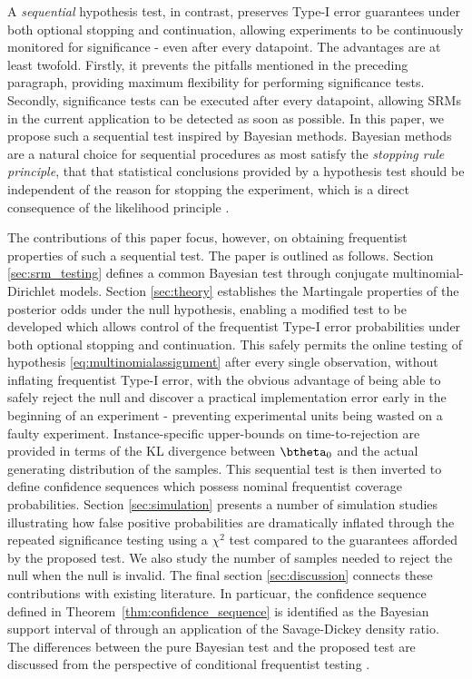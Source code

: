\documentclass[11pt]{article}
\begin{document}
A \textit{sequential} hypothesis test, in contrast, preserves Type-I error guarantees under both optional stopping and continuation, allowing experiments to be continuously monitored for significance - even after every datapoint.
The advantages are at least twofold. Firstly, it prevents the pitfalls mentioned in the preceding paragraph, providing maximum flexibility for performing significance tests.
Secondly, significance tests can be executed after every datapoint, allowing SRMs in the current application to be detected as soon as possible.
In this paper, we propose such a sequential test inspired by Bayesian methods.
Bayesian methods are a natural choice for sequential procedures as most satisfy the \textit{stopping rule principle}, that that statistical conclusions provided by a hypothesis test should be independent of the reason for stopping the experiment, which is a direct consequence of the likelihood principle \citep{likelihood}.

The contributions of this paper focus, however, on obtaining frequentist properties of such a sequential test.
The paper is outlined as follows.
Section \ref{sec:srm_testing} defines a common Bayesian test through conjugate multinomial-Dirichlet models.
Section \ref{sec:theory} establishes the Martingale properties of the posterior odds under the null hypothesis, enabling a modified test to be developed which allows control of the frequentist Type-I error probabilities under both optional stopping and continuation.
This safely permits the online testing of hypothesis \eqref{eq:multinomialassignment} after every single observation, without inflating frequentist Type-I error, with the obvious advantage of being able to safely reject the null and discover a practical implementation error early in the beginning of an experiment - preventing experimental units being wasted on a faulty experiment.
Instance-specific upper-bounds on time-to-rejection are provided in terms of the KL divergence  between $\btheta_0$ and the actual generating distribution of the samples.
This sequential test is then inverted to define confidence sequences which possess nominal frequentist coverage probabilities.
Section \ref{sec:simulation} presents a number of simulation studies illustrating how false positive probabilities are dramatically inflated through the repeated significance testing using a $\chi^2$ test compared to the guarantees afforded by the proposed test.
We also study the number of samples needed to reject the null when the null is invalid.
The final section \ref{sec:discussion} connects these contributions with existing literature.
In particuar, the confidence sequence defined in Theorem~\ref{thm:confidence_sequence} is identified as the Bayesian support interval of \cite{support_interval} through an application of the Savage-Dickey density ratio.
The differences between the pure Bayesian test and the proposed test are discussed from the perspective of conditional frequentist testing \citep{conditional_frequentist_simple, conditional_frequentist_precise, conditional_frequentist_composite}.
\end{document}
